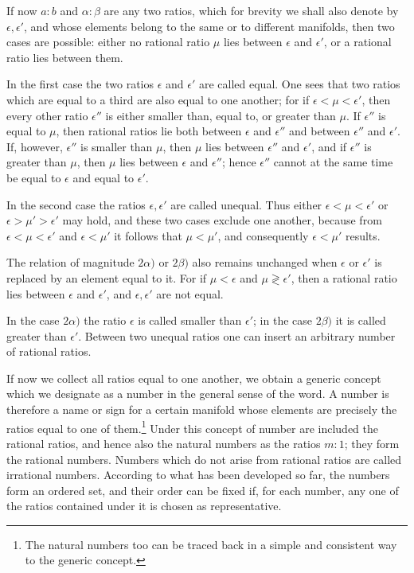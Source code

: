 \documentclass[11pt]{article}
\begin{document}
If now $a:b$ and $\alpha:\beta$ are any two ratios, which for brevity we shall also denote by $\epsilon,\epsilon'$, and whose elements belong to the same or to different manifolds, then two cases are possible: either no rational ratio $\mu$ lies between $\epsilon$ and $\epsilon'$, or a rational ratio lies between them.

In the first case the two ratios $\epsilon$ and $\epsilon'$ are called equal. One sees that two ratios which are equal to a third are also equal to one another; for if $\epsilon<\mu<\epsilon'$, then every other ratio $\epsilon''$ is either smaller than, equal to, or greater than $\mu$. If $\epsilon''$ is equal to $\mu$, then rational ratios lie both between $\epsilon$ and $\epsilon''$ and between $\epsilon''$ and $\epsilon'$. If, however, $\epsilon''$ is smaller than $\mu$, then $\mu$ lies between $\epsilon''$ and $\epsilon'$, and if $\epsilon''$ is greater than $\mu$, then $\mu$ lies between $\epsilon$ and $\epsilon''$; hence $\epsilon''$ cannot at the same time be equal to $\epsilon$ and equal to $\epsilon'$.

In the second case the ratios $\epsilon,\epsilon'$ are called unequal. Thus either $\epsilon<\mu<\epsilon'$ or $\epsilon>\mu'>\epsilon'$ may hold, and these two cases exclude one another, because from $\epsilon<\mu<\epsilon'$ and $\epsilon<\mu'$ it follows that $\mu<\mu'$, and consequently $\epsilon<\mu'$ results.

The relation of magnitude $2\alpha)$ or $2\beta)$ also remains unchanged when $\epsilon$ or $\epsilon'$ is replaced by an element equal to it. For if $\mu<\epsilon$ and $\mu\gtrless\epsilon'$, then a rational ratio lies between $\epsilon$ and $\epsilon'$, and $\epsilon,\epsilon'$ are not equal.

In the case $2\alpha)$ the ratio $\epsilon$ is called smaller than $\epsilon'$; in the case $2\beta)$ it is called greater than $\epsilon'$. Between two unequal ratios one can insert an arbitrary number of rational ratios.

If now we collect all ratios equal to one another, we obtain a generic concept which we designate as a number in the general sense of the word. A number is therefore a name or sign for a certain manifold whose elements are precisely the ratios equal to one of them.\footnote{The natural numbers too can be traced back in a simple and consistent way to the generic concept.} Under this concept of number are included the rational ratios, and hence also the natural numbers as the ratios $m:1$; they form the rational numbers. Numbers which do not arise from rational ratios are called irrational numbers. According to what has been developed so far, the numbers form an ordered set, and their order can be fixed if, for each number, any one of the ratios contained under it is chosen as representative.
\end{document}

